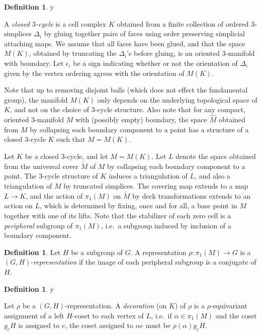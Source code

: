 \documentclass[11pt]{amsart}
\theoremstyle{definition}
\newtheorem{definition}[theorem]{Definition}
\numberwithin{equation}{section}
\def\printname#1{
        \if\draft y
                \smash{\makebox[0pt]{\hspace{-0.5in}
                        \raisebox{8pt}{\tt\tiny #1}}}
        \fi
}
\def\lbl#1{\label{#1}\printname{#1}}
\begin{document}
\begin{definition}
\lbl{cycledefn} 
A \emph{closed $3$-cycle} is a cell complex $K$ obtained from a finite 
collection of ordered $3$-simplices $\Delta_i$ by gluing together pairs 
of faces using order preserving simplicial attaching maps. We assume that 
all faces have been glued, and that the space $M(K)$, obtained by truncating 
the $\Delta_i$'s before gluing, is an oriented $3$-manifold with boundary. 
Let $\epsilon_i$ be a sign indicating whether or not the orientation of 
$\Delta_i$ given by the vertex ordering agrees with the orientation of $M(K)$.
\end{definition}

Note that up to removing disjoint balls (which does not effect the 
fundamental group), the manifold $M(K)$ only depends on the underlying 
topological space of $K$, and not on the choice of $3$-cycle structure. 
Also note that for any compact, oriented $3$-manifold $M$ with 
(possibly empty) boundary, the space $\widehat M$ obtained from $M$ by 
collapsing each boundary component to a point has a structure of a closed 
$3$-cycle $K$ such that $M=M(K)$. 

Let $K$ be a closed $3$-cycle, and let $M=M(K)$. Let $L$ denote the space 
obtained from the universal cover $\widetilde M$ of $M$ by collapsing each 
boundary component to a point. The $3$-cycle structure of $K$ induces a 
triangulation of $L$, and also a triangulation of $M$ by truncated simplices. 
The covering map extends to a map $L\to K$, and the action of $\pi_1(M)$ on 
$\widetilde M$ by deck transformations extends to an action on $L$, which is 
determined by fixing, once and for all, a base point in $M$ together with 
one of its lifts. 
Note that the stabilizer of each zero cell is a \emph{peripheral} subgroup 
of $\pi_1(M)$, i.e.~a subgroup induced by inclusion of a boundary component. 

\begin{definition} 
Let $H$ be a subgroup of $G$. A representation $\rho\colon\pi_1(M)\to G$ is a 
$(G,H)$-\emph{representation} if the image of each peripheral subgroup is a 
conjugate of $H$. 
\end{definition}

\begin{definition}
\lbl{decorationdefn} 
Let $\rho$ be a $(G,H)$-representation. A \emph{decoration} (on $K$) of 
$\rho$ is a $\rho$-equivariant assignment of a left $H$-coset to each vertex 
of $L$, i.e.~if $\alpha\in\pi_1(M)$ and the coset $g_eH$ is assigned to $e$, 
the coset assigned to $\alpha e$ must be $\rho(\alpha)g_eH$.
\end{definition}
\end{document}
